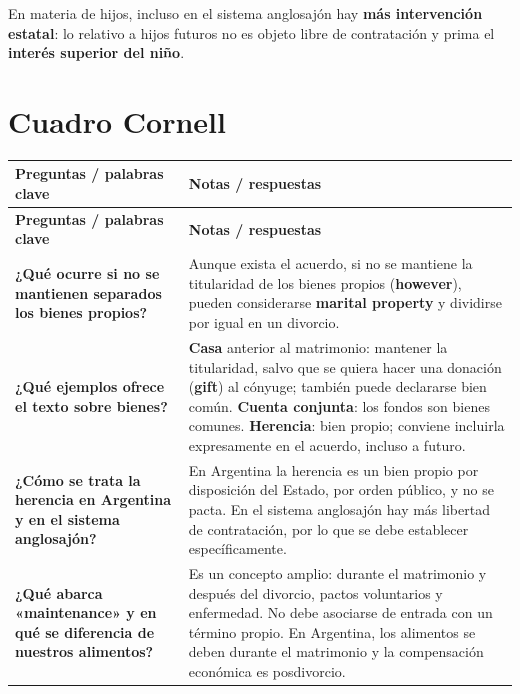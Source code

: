 \documentclass[12pt,oneside]{book}
\newlength{\cornL}
\newlength{\cornR}
\begin{document}
\begin{important}
En materia de hijos, incluso en el sistema anglosajón hay \textbf{más intervención estatal}: lo relativo a hijos futuros no es objeto libre de contratación y prima el \textbf{interés superior del niño}.
\end{important}

\section{Cuadro Cornell}

\begin{longtable}{@{}p{\cornL}|p{\cornR}@{}}
\toprule
\textbf{Preguntas / palabras clave} & \textbf{Notas / respuestas} \\
\midrule
\endfirsthead
\toprule
\textbf{Preguntas / palabras clave} & \textbf{Notas / respuestas} \\
\midrule
\endhead
\bottomrule
\endfoot
\bottomrule
\endlastfoot

\textbf{¿Qué ocurre si no se mantienen separados los bienes propios?} &
Aunque exista el acuerdo, si no se mantiene la titularidad de los bienes propios (\textbf{however}), pueden considerarse \textbf{marital property} y dividirse por igual en un divorcio. \\[0.6em]

\textbf{¿Qué ejemplos ofrece el texto sobre bienes?} &
\textbf{Casa} anterior al matrimonio: mantener la titularidad, salvo que se quiera hacer una donación (\textbf{gift}) al cónyuge; también puede declararse bien común. \textbf{Cuenta conjunta}: los fondos son bienes comunes. \textbf{Herencia}: bien propio; conviene incluirla expresamente en el acuerdo, incluso a futuro. \\[0.6em]

\textbf{¿Cómo se trata la herencia en Argentina y en el sistema anglosajón?} &
En Argentina la herencia es un bien propio por disposición del Estado, por orden público, y no se pacta. En el sistema anglosajón hay más libertad de contratación, por lo que se debe establecer específicamente. \\[0.6em]

\textbf{¿Qué abarca «maintenance» y en qué se diferencia de nuestros alimentos?} &
Es un concepto amplio: durante el matrimonio y después del divorcio, pactos voluntarios y enfermedad. No debe asociarse de entrada con un término propio. En Argentina, los alimentos se deben durante el matrimonio y la compensación económica es posdivorcio. \\[0.6em]


\end{longtable}
\end{document}
